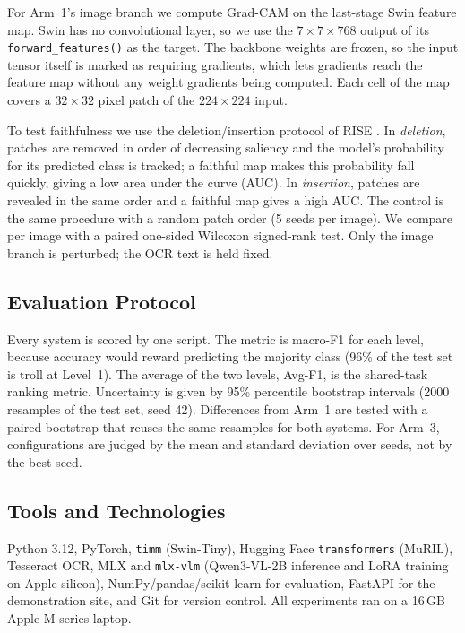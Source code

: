 For Arm~1's image branch we compute Grad-CAM \cite{selvaraju2020gradcam} on the last-stage Swin feature map. Swin has no convolutional layer, so we use the $7\times7\times768$ output of its \texttt{forward\_features()} as the target. The backbone weights are frozen, so the input tensor itself is marked as requiring gradients, which lets gradients reach the feature map without any weight gradients being computed. Each cell of the map covers a $32\times32$ pixel patch of the $224\times224$ input.

To test faithfulness we use the deletion/insertion protocol of RISE \cite{petsiuk2018rise}. In \emph{deletion}, patches are removed in order of decreasing saliency and the model's probability for its predicted class is tracked; a faithful map makes this probability fall quickly, giving a low area under the curve (AUC). In \emph{insertion}, patches are revealed in the same order and a faithful map gives a high AUC. The control is the same procedure with a random patch order (5 seeds per image). We compare per image with a paired one-sided Wilcoxon signed-rank test. Only the image branch is perturbed; the OCR text is held fixed.

\subsection{Evaluation Protocol}

Every system is scored by one script. The metric is macro-F1 for each level, because accuracy would reward predicting the majority class (96\% of the test set is troll at Level~1). The average of the two levels, Avg-F1, is the shared-task ranking metric. Uncertainty is given by 95\% percentile bootstrap intervals (2000 resamples of the test set, seed 42). Differences from Arm~1 are tested with a paired bootstrap that reuses the same resamples for both systems. For Arm~3, configurations are judged by the mean and standard deviation over seeds, not by the best seed.

\subsection{Tools and Technologies}

Python 3.12, PyTorch, \texttt{timm} (Swin-Tiny), Hugging Face \texttt{transformers} (MuRIL), Tesseract OCR, MLX and \texttt{mlx-vlm} (Qwen3-VL-2B inference and LoRA training on Apple silicon), NumPy/pandas/scikit-learn for evaluation, FastAPI for the demonstration site, and Git for version control. All experiments ran on a 16\,GB Apple M-series laptop.

